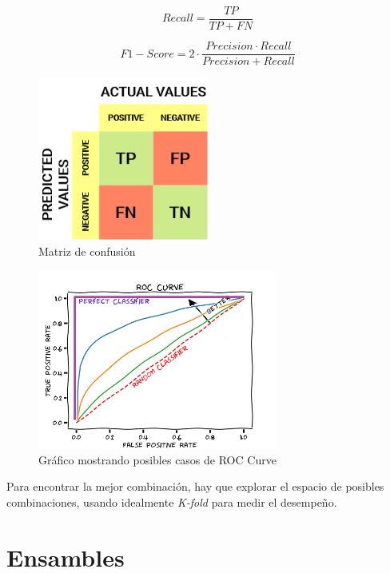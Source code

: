 \documentclass[titlepage,a4paper]{article}
\begin{document}
\begin{equation}
    Recall = \frac{TP}{TP+FN}
\end{equation}

\begin{equation}
    F1-Score = 2 \cdot \frac{Precision \cdot Recall}{Precision + Recall}
\end{equation}

\begin{figure}[!htb]
    \centering
    \includegraphics[width=0.5\textwidth]{imagenesResumen/MatrizDeConfusion.png}
    \caption{Matriz de confusión}
    \label{MatrizDeConfusion}
\end{figure}

\begin{figure}[!htb]
    \centering
    \includegraphics[width=0.7\textwidth]{imagenesResumen/ROCCurve.png}
    \caption{Gráfico mostrando posibles casos de ROC Curve}
    \label{ROCCurve}
\end{figure}



Para encontrar la mejor combinación, hay que explorar el espacio de posibles combinaciones, usando idealmente \textit{K-fold} para medir el desempeño.


\section{Ensambles}
\end{document}
